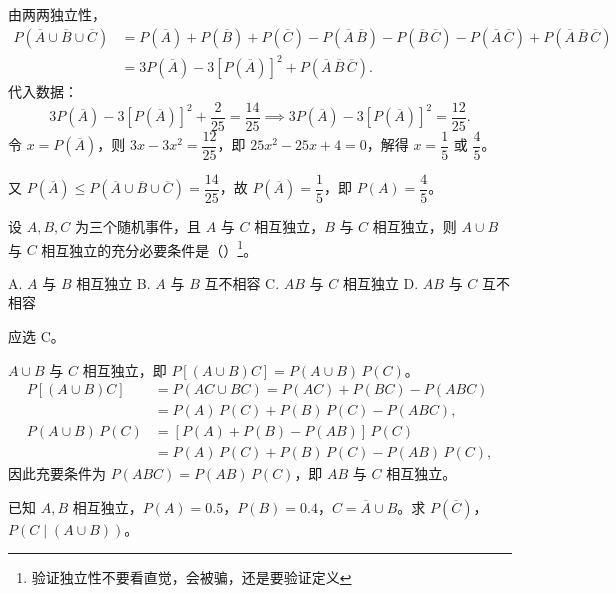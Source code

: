 \documentclass[lang=cn,11pt]{elegantbook}
\begin{document}
\begin{solution}
由两两独立性，
\[
\begin{aligned}
P(\overline{A} \cup \overline{B} \cup \overline{C}) &= P(\overline{A})+P(\overline{B})+P(\overline{C}) - P(\overline{A}\,\overline{B}) - P(\overline{B}\,\overline{C}) - P(\overline{A}\,\overline{C}) + P(\overline{A}\,\overline{B}\,\overline{C}) \\
&= 3P(\overline{A}) - 3[P(\overline{A})]^2 + P(\overline{A}\,\overline{B}\,\overline{C}).
\end{aligned}
\]
代入数据：
\[
3P(\overline{A}) - 3[P(\overline{A})]^2 + \frac{2}{25} = \frac{14}{25} \implies 3P(\overline{A}) - 3[P(\overline{A})]^2 = \frac{12}{25}.
\]
令 \(x = P(\overline{A})\)，则 \(3x - 3x^2 = \dfrac{12}{25}\)，即 \(25x^2 - 25x + 4 = 0\)，解得 \(x = \dfrac{1}{5}\) 或 \(\dfrac{4}{5}\)。

又 \(P(\overline{A}) \le P(\overline{A} \cup \overline{B} \cup \overline{C}) = \dfrac{14}{25}\)，故 \(P(\overline{A}) = \dfrac{1}{5}\)，即 \(P(A) = \dfrac{4}{5}\)。
\end{solution}

\begin{exercise}\label{exer:1-43}
设 \(A,B,C\) 为三个随机事件，且 \(A\) 与 \(C\) 相互独立，\(B\) 与 \(C\) 相互独立，则 \(A\cup B\) 与 \(C\) 相互独立的充分必要条件是（\quad）\footnote{验证独立性不要看直觉，会被骗，还是要验证定义}。\par
A. \(A\) 与 \(B\) 相互独立\quad
B. \(A\) 与 \(B\) 互不相容\quad
C. \(AB\) 与 \(C\) 相互独立\quad
D. \(AB\) 与 \(C\) 互不相容
\end{exercise}

\begin{solution}
应选 C。

\(A\cup B\) 与 \(C\) 相互独立，即 \(P[(A\cup B)C] = P(A\cup B)\,P(C)\)。
\[
\begin{aligned}
P[(A\cup B)C] &= P(AC\cup BC) = P(AC)+P(BC)-P(ABC) \\
&= P(A)\,P(C)+P(B)\,P(C)-P(ABC), \\
P(A\cup B)\,P(C) &= [P(A)+P(B)-P(AB)]\,P(C) \\
&= P(A)\,P(C)+P(B)\,P(C)-P(AB)\,P(C),
\end{aligned}
\]
因此充要条件为 \(P(ABC)=P(AB)\,P(C)\)，即 \(AB\) 与 \(C\) 相互独立。
\end{solution}

\begin{exercise}\label{exer:1-56}
已知 \(A,B\) 相互独立，\(P(A)=0.5\)，\(P(B)=0.4\)，\(C=\overline{A}\cup B\)。求 \(P(\overline{C})\)，\(P(C\mid(A\cup B))\)。
\end{exercise}
\end{document}
